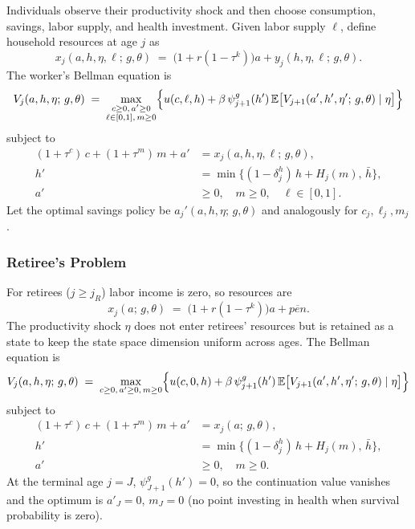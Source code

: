 \documentclass[12pt,a4paper]{article}
\newcommand{\E}{\mathbb{E}}
\begin{document}
Individuals observe their productivity shock and then choose consumption, savings, labor supply, and health investment. Given labor supply $\ell$, define household resources at age $j$ as
\begin{equation}
\label{eq:resources_worker}
x_j(a, h, \eta, \ell;\, g, \theta) \;=\; \bigl(1 + r(1 - \tau^k)\bigr) a + y_j(h, \eta, \ell;\, g, \theta).
\end{equation}
The worker's Bellman equation is
\begin{equation}
\label{eq:worker_bellman}
V_j(a, h, \eta;\, g,\theta)
\;=\;
\max_{\substack{c \geq 0,\, a' \geq 0 \\ \ell \in [0,1],\, m \geq 0}}
\Bigl\{
u(c, \ell, h)
+ \beta\, \psi_{j+1}^{g}(h')\,
\E\bigl[V_{j+1}(a', h', \eta';\, g, \theta) \mid \eta\bigr]
\Bigr\}
\end{equation}
subject to
\begin{align}
(1 + \tau^c)\, c + (1 + \tau^m)\, m + a' &= x_j(a, h, \eta, \ell;\, g, \theta), \label{eq:worker_budget}\\
h' &= \min\bigl\{(1 - \delta_j^h)\, h + H_j(m),\, \bar h\bigr\}, \label{eq:worker_health}\\
a' &\geq 0,\quad m \geq 0,\quad \ell \in [0,1]. \label{eq:worker_borrow}
\end{align}
Let the optimal savings policy be $a_j'(a, h, \eta;\, g, \theta)$ and analogously for $c_j, \ell_j, m_j$.

\subsubsection{Retiree's Problem}
\label{subsubsec:retiree}
For retirees ($j \geq j_R$) labor income is zero, so resources are
\begin{equation}
\label{eq:resources_retiree}
x_j(a;\, g, \theta) \;=\; \bigl(1 + r(1-\tau^k)\bigr) a + \overline{pen}.
\end{equation}
The productivity shock $\eta$ does not enter retirees' resources but is retained as a state to keep the state space dimension uniform across ages. The Bellman equation is
\begin{equation}
\label{eq:retiree_bellman}
V_j(a, h, \eta;\, g, \theta)
\;=\;
\max_{c \geq 0,\, a' \geq 0,\, m \geq 0}
\Bigl\{
u(c, 0, h)
+ \beta\, \psi_{j+1}^{g}(h')\,
\E\bigl[V_{j+1}(a', h', \eta';\, g, \theta) \mid \eta\bigr]
\Bigr\}
\end{equation}
subject to
\begin{align}
(1 + \tau^c)\, c + (1 + \tau^m)\, m + a' &= x_j(a;\, g, \theta), \label{eq:retiree_budget}\\
h' &= \min\bigl\{(1 - \delta_j^h)\, h + H_j(m),\, \bar h\bigr\}, \label{eq:retiree_health}\\
a' &\geq 0,\quad m \geq 0. \label{eq:retiree_borrow}
\end{align}
At the terminal age $j = J$, $\psi_{J+1}^{g}(h') = 0$, so the continuation value vanishes and the optimum is $a'_J = 0$, $m_J = 0$ (no point investing in health when survival probability is zero).
\end{document}
